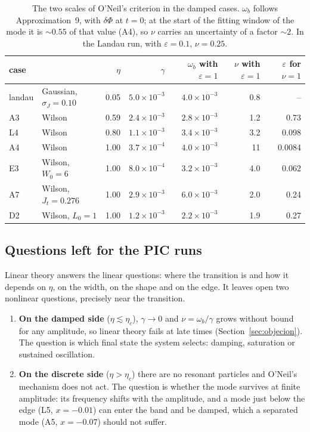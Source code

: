 \documentclass[11pt,a4paper]{article}
\begin{document}
\begin{table}[!htbp]
\centering
\small
\begin{tabular}{llrrrrr}
\toprule
case & & $\eta$ & $\gamma$ & $\omega_b$ with $\varepsilon=1$ & $\nu$ with $\varepsilon=1$ & $\varepsilon$ for $\nu=1$\\
\midrule
landau & Gaussian, $\sigma_J=0.10$ & 0.05 & $5.0\times10^{-3}$ & $4.0\times10^{-3}$ & 0.8 & --\\
A3 & Wilson & 0.59 & $2.4\times10^{-3}$ & $2.8\times10^{-3}$ & 1.2 & 0.73\\
L4 & Wilson & 0.80 & $1.1\times10^{-3}$ & $3.4\times10^{-3}$ & 3.2 & 0.098\\
A4 & Wilson & 1.00 & $3.7\times10^{-4}$ & $4.0\times10^{-3}$ & 11 & 0.0084\\
E3 & Wilson, $W_0=6$ & 1.00 & $8.0\times10^{-4}$ & $3.2\times10^{-3}$ & 4.0 & 0.062\\
A7 & Wilson, $J_t=0.276$ & 1.00 & $2.9\times10^{-3}$ & $6.0\times10^{-3}$ & 2.0 & 0.24\\
D2 & Wilson, $L_0=1$ & 1.00 & $1.2\times10^{-3}$ & $2.2\times10^{-3}$ & 1.9 & 0.27\\
\bottomrule
\end{tabular}
\caption{The two scales of O'Neil's criterion in the damped cases. $\omega_b$ follows
Approximation~9, with $\delta\Phi$ at $t=0$; at the start of the fitting window of the mode it
is $\sim0.55$ of that value (A4), so $\nu$ carries an uncertainty of a factor $\sim2$. In the
Landau run, with $\varepsilon=0.1$, $\nu=0.25$.}
\label{tab:escalas}
\end{table}

\subsection{Questions left for the PIC runs}
\label{sec:dejaPIC}

Linear theory answers the linear questions: where the transition is and how it depends
on $\eta$, on the width, on the shape and on the edge. It leaves open two nonlinear
questions, precisely near the transition.
\begin{enumerate}
\item \textbf{On the damped side} ($\eta\lesssim\eta_c$), $\gamma\to0$ and $\nu=\omega_b/\gamma$ grows without
bound for any amplitude, so linear theory fails at late times
(Section~\ref{sec:objecion}). The question is which final state the system selects:
damping, saturation or sustained oscillation.
\item \textbf{On the discrete side} ($\eta>\eta_c$) there are no resonant particles and O'Neil's
mechanism does not act. The question is whether the mode survives at finite amplitude:
its frequency shifts with the amplitude, and a mode just below the edge (L5, $x=-0.01$)
can enter the band and be damped, which a separated mode (A5, $x=-0.07$) should not
suffer.
\end{enumerate}
\end{document}
